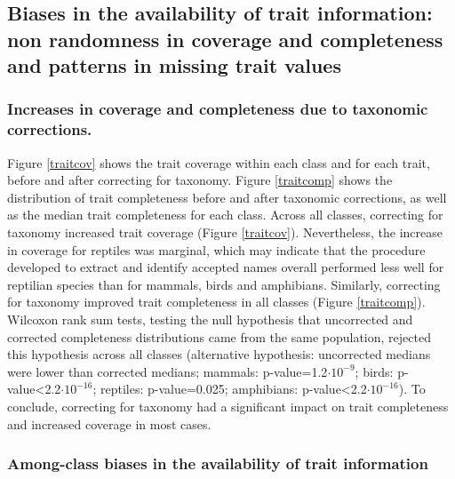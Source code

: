 \subsection{Biases in the availability of trait information: non randomness in coverage and completeness and patterns in missing trait values}

\subsubsection{Increases in coverage and completeness due to taxonomic corrections.} 
Figure \ref{traitcov} shows the trait coverage within each class and for each trait, before and after correcting for taxonomy. Figure \ref{traitcomp} shows the distribution of trait completeness before and after taxonomic corrections, as well as the median trait completeness for each class.
Across all classes, correcting for taxonomy increased trait coverage (Figure \ref{traitcov}). Nevertheless, the increase in coverage for reptiles was marginal, which may indicate that the procedure developed to extract and identify accepted names overall performed less well for reptilian species than for mammals, birds and amphibians. Similarly, correcting for taxonomy improved trait completeness in all classes (Figure \ref{traitcomp}). Wilcoxon rank sum tests, testing the null hypothesis that uncorrected and corrected completeness distributions came from the same population, rejected this hypothesis across all classes (alternative hypothesis: uncorrected medians were lower than corrected medians; mammals: p-value=1.2$\cdot10^{-9}$; birds: p-value<2.2$\cdot10^{-16}$; reptiles: p-value=0.025; amphibians: p-value<2.2$\cdot10^{-16}$). To conclude, correcting for taxonomy had a significant impact on trait completeness and increased coverage in most cases. 

\subsubsection{Among-class biases in the availability of trait information}

